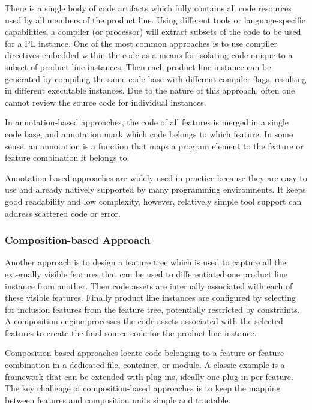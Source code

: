 \documentclass[sigconf]{acmart}
\begin{document}
There is a single body of code artifacts which fully contains all code resources used by all members of the product line.
Using different tools or language-specific capabilities, a compiler (or processor) will extract subsets of the code to be used
 for a PL instance. One of the most common approaches is to use compiler directives embedded within the code as a means
 for isolating code unique to a subset of product line instances. Then each product line instance can be generated
 by compiling the same code base with different compiler flags, resulting in different executable instances.
 Due to the nature of this approach, often one cannot review the source code for individual instances.

In annotation-based approaches, the code of all features is merged in a single code base, and annotation mark which code
 belongs to which feature. In some sense, an annotation is a function that maps a program element to the feature or
 feature combination it belongs to.

Annotation-based approaches are widely used in practice because they are easy to use and already natively supported
by many programming environments. It keeps good readability and low complexity, however, relatively simple tool support
can address scattered code or error.




\subsubsection{Composition-based Approach}

Another approach is to design a feature tree which is used to capture all the externally visible features that
can be used to differentiated one product line instance from another. Then code assets are internally associated
 with each of these visible features. Finally product line instances are configured by selecting for inclusion
  features from the feature tree, potentially restricted by constraints. A composition engine processes the
  code assets associated with the selected features to create the final source code for the product line instance.

Composition-based approaches locate code belonging to a feature or feature combination in a dedicated file,
container, or module. A classic example is a framework that can be extended with plug-ins, ideally one plug-in
per feature. The key challenge of composition-based approaches is to keep the mapping between features and
composition units simple and tractable.
\end{document}
